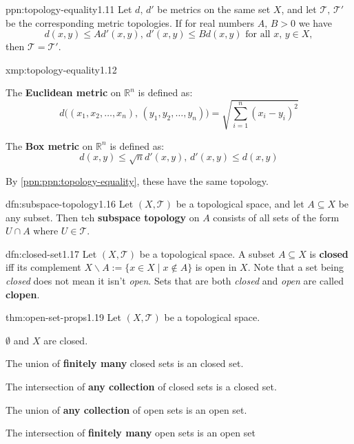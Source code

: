 \documentclass[landscape, 8pt]{extarticle}
\begin{document}
\begin{multicols}{3}
\begin{ppn}{ppn:topology-equality}{1.11}
	Let $d,\,d'$ be metrics on the same set $X$, and let $\mathcal{T},\,\mathcal{T}'$ be the corresponding metric topologies. If for real numbers $A,\, B > 0$ we have
	\[d(x, y) \le Ad'(x, y),\, d'(x, y) \le Bd(x, y) \text{ for all } x,\,y\in X,\]
	then $\mathcal{T} = \mathcal{T}'$.
\end{ppn}

\begin{xmp}{xmp:topology-equality}{1.12}
\begin{itemize-tight}
\item The \textbf{Euclidean metric} on $\mathbb{R}^{n}$ is defined as:
\[d\bigl((x_{1},x_{2},\dots,x_{n}),\, (y_{1},y_{2},\dots,y_{n})\bigr) = \sqrt{\sum_{i = 1}^{n}(x_{i} - y_{i})^{2}}\]
\item The \textbf{Box metric} on $\mathbb{R}^{n}$ is defined as:
\[d(x, y) \le \sqrt{n} d'(x,y),\, d'(x,y) \le d(x, y)\]
\end{itemize-tight}
By \ref{ppn:ppn:topology-equality}, these have the same topology.
\end{xmp}

\begin{dfn}{dfn:subspace-topology}{1.16}
	Let $(X, \mathcal{T})$ be a topological space, and let $A \subseteq X$ be any subset. Then teh \textbf{subspace topology} on $A$ consists of all sets of the form $U \cap A$ where $U \in \mathcal{T}$.
\end{dfn}

\begin{dfn}{dfn:closed-set}{1.17}
	Let $(X, \mathcal{T})$ be a topological space. A subset $A \subseteq X$ is \textbf{closed} iff its complement $X \backslash A := \{x \in X \mid x \not\in A\}$ is open in $X$. Note that a set being \textit{closed} does not mean it isn't \textit{open}. Sets that are both \textit{closed} and \textit{open} are called \textbf{clopen}.
\end{dfn}

\begin{thm}{thm:open-set-props}{1.19}
\vspace{-5pt}
Let $(X,\mathcal{T})$ be a topological space.
\vspace{-5pt}
\begin{enumerate-zero}
\item $\emptyset$ and $X$ are closed.
\item The union of \textbf{finitely many} closed sets is an closed set.
\item The intersection of \textbf{any collection} of closed sets is a closed set.
\item The union of \textbf{any collection} of open sets is an open set.
\item The intersection of \textbf{finitely many} open sets is an open set
\end{enumerate-zero}
\end{thm}


\end{multicols}
\end{document}
